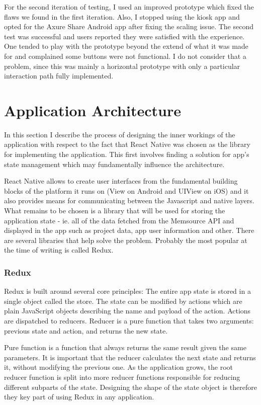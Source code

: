 For the second iteration of testing, I used an improved prototype which fixed the flaws we found in the first iteration. Also, I stopped using the kiosk app and opted for the Axure Share Android app after fixing the scaling issue. The second test was successful and users reported they were satisfied with the experience. One tended to play with the prototype beyond the extend of what it was made for and complained some buttons were not functional. I do not consider that a problem, since this was mainly a horizontal prototype with only a particular interaction path fully implemented.



\section{Application Architecture}

In this section I describe the process of designing the inner workings of the application with respect to the fact that React Native was chosen as the library for implementing the application. This first involves finding a solution for app's state management which may fundamentally influence the architecture.

React Native allows to create user interfaces from the fundamental building blocks of the platform it runs on (View on Android and UIView on iOS) and it also provides means for communicating between the Javascript and native layers. What remains to be chosen is a library that will be used for storing the application state - ie. all of the data fetched from the Memsource API and displayed in the app such as project data, app user information and other. There are several libraries that help solve the problem. Probably the most popular at the time of writing is called Redux.

\subsubsection{Redux}

Redux is built around several core principles:
The entire app state is stored in a single object called the store. The state can be modified by actions which are plain JavaScript objects describing the name and payload of the action. Actions are dispatched to reducers. Reducer is a pure function that takes two arguments: previous state and action, and returns the new state.

Pure function is a function that always returns the same result given the same parameters. It is important that the reducer calculates the next state and returns it, without modifying the previous one.
As the application grows, the root reducer function is split into more reducer functions responsible for reducing different subparts of the state. Designing the shape of the state object is therefore they key part of using Redux in any application.

